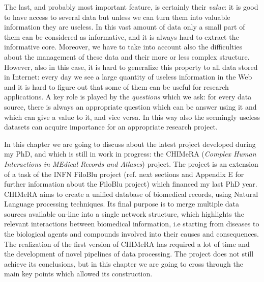 \documentclass{standalone}
\begin{document}
The last, and probably most important feature, is certainly their \emph{value}: it is good to have access to several data but unless we can turn them into valuable information they are useless.
In this vast amount of data only a small part of them can be considered as informative, and it is always hard to extract the informative core.
Moreover, we have to take into account also the difficulties about the management of these data and their more or less complex structure.
However, also in this case, it is hard to generalize this property to all data stored in Internet: every day we see a large quantity of useless information in the Web and it is hard to figure out that some of them can be useful for research applications.
A key role is played by the \emph{questions} which we ask: for every data source, there is always an appropriate question which can be answer using it and which can give a value to it, and vice versa.
In this way also the seemingly useless datasets can acquire importance for an appropriate research project.

In this chapter we are going to discuss about the latest project developed during my PhD, and which is still in work in progress: the \textsf{CHIMeRA} (\emph{Complex Human Interactions in MEdical Records and Atlases}) project.
The project is an extension of a task of the INFN FiloBlu project (ref. next sections and Appendix E for further information about the FiloBlu project) which financed my last PhD year.
\textsf{CHIMeRA} aims to create a unified database of biomedical records, using Natural Language processing techniques.
Its final purpose is to merge multiple data sources available on-line into a single network structure, which highlights the relevant interactions between biomedical information, i.e starting from diseases to the biological agents and compounds involved into their causes and consequences.
The realization of the first version of \textsf{CHIMeRA} has required a lot of time and the development of novel pipelines of data processing.
The project does not still achieve its conclusions, but in this chapter we are going to cross through the main key points which allowed its construction.

\end{document}
